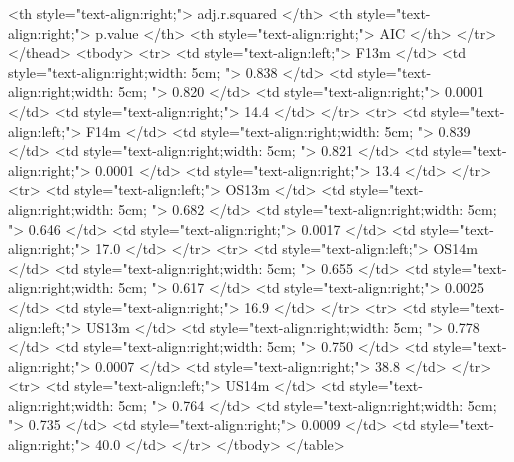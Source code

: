 \documentclass[
]{article}
\begin{document}
\begin{table}[!htb]
\begin{minipage}{.5\linewidth}
   <th style="text-align:right;"> adj.r.squared </th>
   <th style="text-align:right;"> p.value </th>
   <th style="text-align:right;"> AIC </th>
  </tr>
 </thead>
<tbody>
  <tr>
   <td style="text-align:left;"> F13m </td>
   <td style="text-align:right;width: 5cm; "> 0.838 </td>
   <td style="text-align:right;width: 5cm; "> 0.820 </td>
   <td style="text-align:right;"> 0.0001 </td>
   <td style="text-align:right;"> 14.4 </td>
  </tr>
  <tr>
   <td style="text-align:left;"> F14m </td>
   <td style="text-align:right;width: 5cm; "> 0.839 </td>
   <td style="text-align:right;width: 5cm; "> 0.821 </td>
   <td style="text-align:right;"> 0.0001 </td>
   <td style="text-align:right;"> 13.4 </td>
  </tr>
  <tr>
   <td style="text-align:left;"> OS13m </td>
   <td style="text-align:right;width: 5cm; "> 0.682 </td>
   <td style="text-align:right;width: 5cm; "> 0.646 </td>
   <td style="text-align:right;"> 0.0017 </td>
   <td style="text-align:right;"> 17.0 </td>
  </tr>
  <tr>
   <td style="text-align:left;"> OS14m </td>
   <td style="text-align:right;width: 5cm; "> 0.655 </td>
   <td style="text-align:right;width: 5cm; "> 0.617 </td>
   <td style="text-align:right;"> 0.0025 </td>
   <td style="text-align:right;"> 16.9 </td>
  </tr>
  <tr>
   <td style="text-align:left;"> US13m </td>
   <td style="text-align:right;width: 5cm; "> 0.778 </td>
   <td style="text-align:right;width: 5cm; "> 0.750 </td>
   <td style="text-align:right;"> 0.0007 </td>
   <td style="text-align:right;"> 38.8 </td>
  </tr>
  <tr>
   <td style="text-align:left;"> US14m </td>
   <td style="text-align:right;width: 5cm; "> 0.764 </td>
   <td style="text-align:right;width: 5cm; "> 0.735 </td>
   <td style="text-align:right;"> 0.0009 </td>
   <td style="text-align:right;"> 40.0 </td>
  </tr>
</tbody>
</table> \end{minipage}
\end{table}
\end{document}

